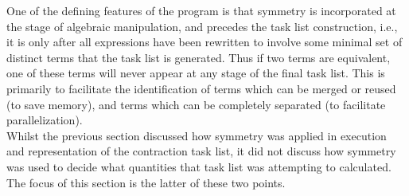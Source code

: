\noindent One of the defining features of the program is that symmetry is
incorporated at the stage of algebraic manipulation, and precedes the task list
construction, i.e., it is only after all expressions have been rewritten to
involve some minimal set of distinct terms that the task list is generated.
Thus if two terms are equivalent, one of these terms will never appear at
any stage of the final task list.  This is primarily to facilitate the
identification of terms which can be merged or reused (to save memory), and
terms which can be completely separated (to facilitate parallelization).\\

\noindent Whilst the previous section discussed how symmetry was applied in 
execution and representation of the contraction task list, it did not
discuss how symmetry was used to decide what quantities that task list was
attempting to calculated. The focus of this section is the latter of these 
two points.\\

